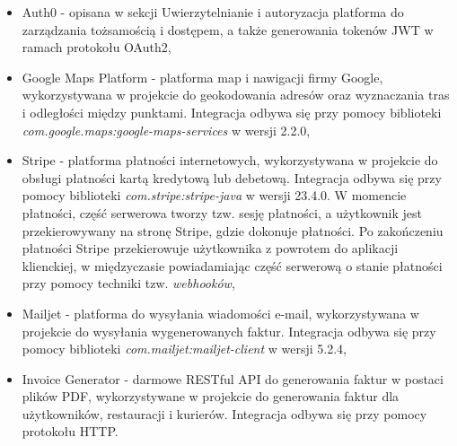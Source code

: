 \begin{itemize}

    \item Auth0 \cite{auth0} - opisana w sekcji Uwierzytelnianie i autoryzacja platforma do zarządzania tożsamością i dostępem, a także generowania tokenów JWT w ramach protokołu OAuth2,
    \item Google Maps Platform \cite{gmaps} - platforma map i nawigacji firmy Google, wykorzystywana w projekcie do geokodowania adresów oraz wyznaczania tras i odległości między punktami. Integracja odbywa się przy pomocy biblioteki \newline \textit{com.google.maps:google-maps-services} w wersji 2.2.0,
    \item Stripe \cite{stripe} - platforma płatności internetowych, wykorzystywana w projekcie do obsługi płatności kartą kredytową lub debetową. Integracja odbywa się przy pomocy biblioteki \textit{com.stripe:stripe-java} w wersji 23.4.0. W momencie płatności, część serwerowa tworzy tzw. sesję płatności, a użytkownik jest przekierowywany na stronę Stripe, gdzie dokonuje płatności. Po zakończeniu płatności Stripe przekierowuje użytkownika z powrotem do aplikacji klienckiej, w międzyczasie powiadamiając część serwerową o stanie płatności przy pomocy techniki tzw. \textit{webhooków},
    \item Mailjet \cite{mailjet} - platforma do wysyłania wiadomości e-mail, wykorzystywana w projekcie do wysyłania wygenerowanych faktur. Integracja odbywa się przy pomocy biblioteki \textit{com.mailjet:mailjet-client} w wersji 5.2.4,
    \item Invoice Generator \cite{invoicegenerator} - darmowe RESTful API do generowania faktur w postaci plików PDF, wykorzystywane w projekcie do generowania faktur dla użytkowników, restauracji i kurierów. Integracja odbywa się przy pomocy protokołu HTTP.

\end{itemize}